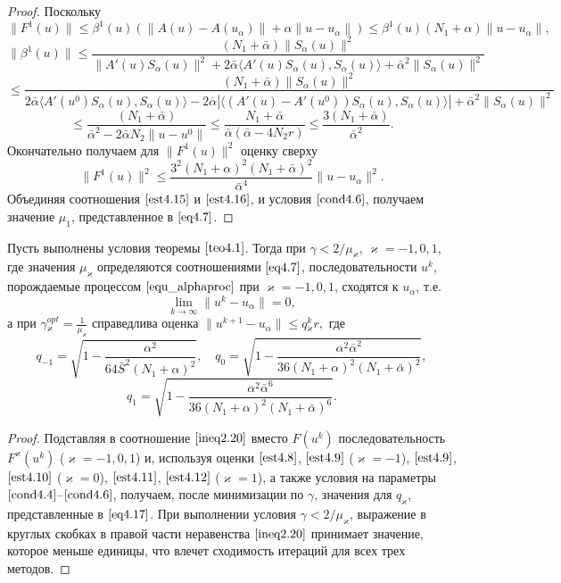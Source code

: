 \begin{proof}
Поскольку
$$\|F^1(u)\|\le\beta^1(u)(\|A(u)-A(u_\alpha)\|+\alpha\|u-u_\alpha\|)\le \beta^1(u)(N_1+\alpha)\|u-u_\alpha\|,$$ $$\|\beta^1(u)\|\le\frac{(N_1+\bar\alpha)\|S_\alpha(u)\|^2}{\|A'(u)S_\alpha(u)\|^2+2\bar\alpha\langle A'(u)S_\alpha(u), S_\alpha(u)\rangle+\bar\alpha^2\|S_\alpha(u)\|^2}$$ $$\le\frac{(N_1+\bar\alpha)\|S_\alpha(u)\|^2}{2\bar\alpha\langle A'(u^0)S_\alpha(u), S_\alpha(u)\rangle-2\bar\alpha|\langle (A'(u)-A'(u^0))S_\alpha(u), S_\alpha(u)\rangle|+\bar\alpha^2\|S_\alpha(u)\|^2}$$$$
\le\frac{(N_1+\bar\alpha)}{\bar\alpha^2-2\bar\alpha N_2\|u-u^0\|}\le\frac{N_1+\bar\alpha}{\bar\alpha(\bar\alpha - 4N_2 r)}\le\frac{3(N_1+\bar\alpha)}{\bar\alpha^2}.$$
Окончательно получаем для $\|F^1(u)\|^2$ оценку сверху
\begin{equation}\label{est4.16}
\|F^1(u)\|^2\le\frac{3^2(N_1+\alpha)^2(N_1+\bar\alpha)^2}{\bar\alpha^4}\|u-u_\alpha\|^2.
\end{equation}
Объединяя соотношения $\eqref{est4.15}$ и $\eqref{est4.16}$, и условия $\eqref{cond4.6}$, получаем значение $\mu_1$, представленное в $\eqref{eq4.7}$.
\end{proof}
\begin{theorem}\label{teo4.3}
	Пусть выполнены условия теоремы $\ref{teo4.1}$. Тогда при $\gamma<2/\mu _\varkappa$, $\varkappa=-1,0,1$, где значения $\mu _\varkappa$ определяются соотношениями $\eqref{eq4.7}$, последовательности ${u^k}$, порождаемые процессом $\eqref{equ_alphaproc}$ при $\varkappa=-1,0,1$, сходятся к $u_\alpha$, т.е. $$\lim_{k\to\infty}\|u^k-u_\alpha\|=0,$$ а при $
	\gamma{_\varkappa^{opt}}=\frac{1}{\mu_\varkappa}$
	справедлива оценка $\|u^{k+1}-u_\alpha\|\le q{_\varkappa^k}r,$ где
	$$
	q_{-1}=\sqrt{1-\frac{\alpha^2}{64\bar S^2(N_1+\alpha)^2}}, \quad q_0=\sqrt{1-\frac{\alpha^2\bar\alpha^2}{36(N_1+\alpha)^2(N_1+\bar\alpha)^2}},$$
	\begin{equation}\label{eq4.17}
	q_1=\sqrt{1-\frac{\alpha^2\bar\alpha^6}{36(N_1+\alpha)^2(N_1+\bar\alpha)^6}}.
	\end{equation}
\end{theorem}
\begin{proof} Подставляя в соотношение $\eqref{ineq2.20}$ вместо $F(u^k)$ последовательность $F^\varkappa(u^k)$ ($\varkappa=-1,0,1$) и, используя оценки $\eqref{est4.8}$, $\eqref{est4.9}$ ($\varkappa=-1$), $\eqref{est4.9}$, $\eqref{est4.10}$ ($\varkappa=0$), $\eqref{est4.11}$, $\eqref{est4.12}$ ($\varkappa=1$), а также условия на параметры $\eqref{cond4.4}$--$\eqref{cond4.6}$, получаем, после минимизации по $\gamma$, значения для $q_\varkappa$, представленные в $\eqref{eq4.17}$. При выполнении условия $\gamma<2/\mu_\varkappa$, выражение в круглых скобках в правой части неравенства $\eqref{ineq2.20}$ принимает значение, которое меньше единицы, что влечет сходимость итераций для всех трех методов.
\end{proof}

